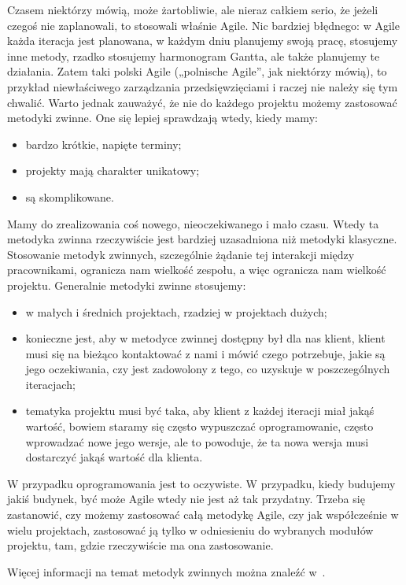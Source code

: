 Czasem niektórzy mówią, może żartobliwie, ale nieraz całkiem serio, że jeżeli czegoś nie zaplanowali,
to stosowali właśnie Agile. Nic bardziej błędnego: w Agile każda iteracja jest planowana,
w każdym dniu planujemy swoją pracę, stosujemy inne metody, rzadko stosujemy harmonogram Gantta,
ale także planujemy te działania. Zatem taki polski Agile („polnische Agile”, jak niektórzy mówią),
to przykład niewłaściwego zarządzania przedsięwzięciami i raczej nie należy się tym chwalić.
Warto jednak zauważyć, że nie do każdego projektu możemy zastosować metodyki zwinne.
One się lepiej sprawdzają wtedy, kiedy mamy:
\begin{itemize}
	\item bardzo krótkie, napięte terminy;
	\item projekty mają charakter unikatowy;
	\item są skomplikowane.
\end{itemize}

Mamy do zrealizowania coś nowego, nieoczekiwanego i mało czasu.
Wtedy ta metodyka zwinna rzeczywiście jest bardziej uzasadniona niż metodyki klasyczne.
Stosowanie metodyk zwinnych, szczególnie żądanie tej interakcji między pracownikami,
ogranicza nam wielkość zespołu, a więc ogranicza nam wielkość projektu.
Generalnie metodyki zwinne stosujemy:
\begin{itemize}
	\item w małych i średnich projektach, rzadziej w projektach dużych;
	\item konieczne jest, aby w metodyce zwinnej dostępny był dla nas klient,
	klient musi się na bieżąco kontaktować z nami i mówić czego potrzebuje,
	jakie są jego oczekiwania, czy jest zadowolony z tego, co uzyskuje w poszczególnych iteracjach;
	\item tematyka projektu musi być taka, aby klient z każdej iteracji miał jakąś wartość,
	bowiem staramy się często wypuszczać oprogramowanie, często wprowadzać nowe jego wersje,
	ale to powoduje, że ta nowa wersja musi dostarczyć jakąś wartość dla klienta.
\end{itemize}

W przypadku oprogramowania jest to oczywiste. W przypadku, kiedy budujemy jakiś budynek,
być może Agile wtedy nie jest aż tak przydatny.
Trzeba się zastanowić, czy możemy zastosować całą metodykę Agile,
czy jak współcześnie w wielu projektach, zastosować ją tylko w odniesieniu
do wybranych modułów projektu, tam, gdzie rzeczywiście ma ona zastosowanie.

Więcej informacji na temat metodyk zwinnych można znaleźć w~\cite{Cohen_2006}.

